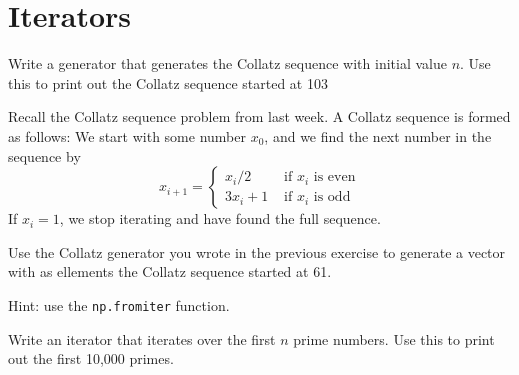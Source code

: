 \section{Iterators} %
\label{sec:iterators}
\begin{questions}
\label{sub:collatz_sequence}

Write a generator that generates the Collatz sequence with initial value $n$.
Use this to print out the Collatz sequence started at 103

Recall the Collatz sequence problem from last week.
A Collatz sequence is formed as follows:
We start with some number $x_0$, and we find the next number in the sequence by
\[
    x_{i+1} = \begin{cases}
        x_i / 2 & \text{ if $x_i$ is even}\\
        3x_i + 1 & \text{ if $x_i$ is odd}
    \end{cases}
\]
If $x_i = 1$, we stop iterating and have found the full sequence.


\label{sub:collatz_array}

Use the Collatz generator you wrote in the previous exercise to generate a vector
with as ellements the Collatz sequence started at 61.

Hint: use the \texttt{np.fromiter} function.


\label{sub:prime_numbers}

Write an iterator that iterates over the first $n$ prime numbers.
Use this to print out the first 10,000 primes.


\end{questions}
